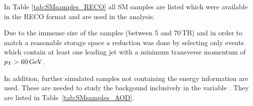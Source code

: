 In Table \ref{tab:SMsamples_RECO} all SM samples are listed which were available in the RECO format and are used in the analysis.
\renewcommand{\arraystretch}{1.5}
\begin{table}[!b]
\centering
\caption{Available and used Standard Model background samples containing $\Delta E/\Delta x$ information.}
\label{tab:SMsamples_RECO}
\end{table}  
Due to the immense size of the samples (between 5 and 70\,TB) and in order to match a reasonable storage space a reduction was done by selecting only events which contain at least one leading jet with a minimum transverse momentum of $p_{\text{T}}>60\,\text{Ge}\kern-0.06667em\text{V}$.

In addition, further simulated samples not containing the energy information are used.
These are needed to study the backgound inclusively in the variable \ias.
They are listed in Table~\ref{tab:SMsamples_AOD}.
\renewcommand{\arraystretch}{1.5}
\begin{table}[!t]
\centering
\caption{Used Standard Model background samples without $\Delta E/\Delta x$ information.}
\label{tab:SMsamples_AOD}
\end{table}  


